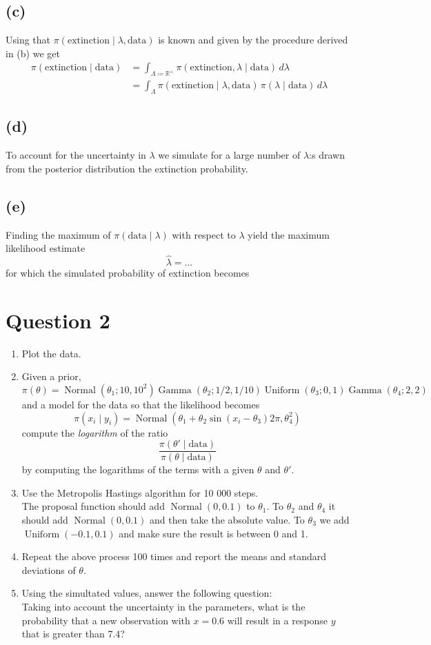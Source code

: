 \documentclass{article}
\DeclareMathOperator\GammaDist{Gamma}
\DeclareMathOperator\Normal{Normal}
\DeclareMathOperator\Uniform{Uniform}
\begin{document}
\subsection{(c)}
Using that $\pi(\text{extinction} \mid \lambda, \text{data})$ is known
and given by the procedure derived in (b) we get
\begin{align*}
\pi(\text{extinction} \mid \text{data}) &= \int_{\Lambda \coloneqq \mathbb R^+} \pi(\text{extinction}, \lambda \mid \text{data}) \, d\lambda \\
	&= \int_\Lambda \pi(\text{extinction} \mid \lambda, \text{data}) \, \pi(\lambda \mid \text{data}) \, d\lambda
\end{align*}

\subsection{(d)}
To account for the uncertainty in $\lambda$ we simulate for
a large number of $\lambda$:s drawn from the posterior distribution
the extinction probability.

\subsection{(e)}
Finding the maximum of $\pi(\text{data} \mid \lambda)$ with respect to $\lambda$
yield the maximum likelihood estimate
$$ \hat\lambda = \ldots $$ %
for which the simulated probability of extinction becomes

\section{Question 2}
\begin{enumerate}[label=(\alph*)]
\item Plot the data. 
\item Given a prior, $$\pi(\theta) = \Normal (\theta_1; 10, 10^2) \GammaDist (\theta_2; 1/2, 1/10) \Uniform (\theta_3; 0, 1) \GammaDist (\theta_4; 2, 2)$$ 
and a model for the data so that the likelihood becomes $$\pi (x_i \mid y_i) = \Normal(\theta_1 + \theta_2 \sin(x_i - \theta_3) 2\pi, \theta_4^2)$$
compute the \textit{logarithm} of the ratio $$\frac{\pi(\theta' \mid \text{data})}{\pi(\theta \mid \text{data})}$$
by computing the logarithms of the terms with a given $\theta$ and $\theta'$.
\item Use the Metropolis Hastings algorithm for 10 000 steps. \\
The proposal function should add $\Normal(0, 0.1)$ to $\theta_1$. 
To $\theta_2$ and $\theta_4$ it should add $\Normal (0, 0.1)$ and then take the absolute value. 
To $\theta_3$ we add $\Uniform(-0.1, 0.1)$ and make sure the result is between 0 and 1. 
\item Repeat the above process 100 times and report the means and standard deviations of $\theta$. 
\item Using the simultated values, answer the following question: \\
Taking into account the uncertainty in the parameters, what is the probability that a new observation with $x = 0.6$ will result in a response $y$ that is greater than 7.4?
\end{enumerate}
\end{document}
